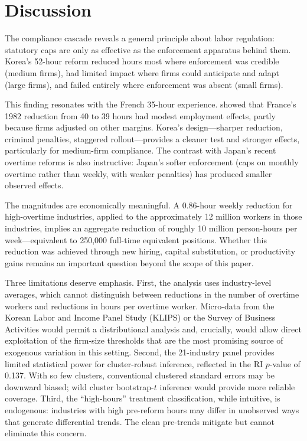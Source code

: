\documentclass[12pt]{article}
\begin{document}


\section{Discussion}
\label{sec:discussion}

The compliance cascade reveals a general principle about labor regulation: statutory caps are only as effective as the enforcement apparatus behind them. Korea's 52-hour reform reduced hours most where enforcement was credible (medium firms), had limited impact where firms could anticipate and adapt (large firms), and failed entirely where enforcement was absent (small firms).

This finding resonates with the French 35-hour experience. \citet{crepon2002} showed that France's 1982 reduction from 40 to 39 hours had modest employment effects, partly because firms adjusted on other margins. Korea's design---sharper reduction, criminal penalties, staggered rollout---provides a cleaner test and stronger effects, particularly for medium-firm compliance. The contrast with Japan's recent overtime reforms \citep{kawaguchi2020} is also instructive: Japan's softer enforcement (caps on monthly overtime rather than weekly, with weaker penalties) has produced smaller observed effects.

The magnitudes are economically meaningful. A 0.86-hour weekly reduction for high-overtime industries, applied to the approximately 12 million workers in those industries, implies an aggregate reduction of roughly 10 million person-hours per week---equivalent to 250,000 full-time equivalent positions. Whether this reduction was achieved through new hiring, capital substitution, or productivity gains remains an important question beyond the scope of this paper.

Three limitations deserve emphasis. First, the analysis uses industry-level averages, which cannot distinguish between reductions in the number of overtime workers and reductions in hours per overtime worker. Micro-data from the Korean Labor and Income Panel Study (KLIPS) or the Survey of Business Activities would permit a distributional analysis and, crucially, would allow direct exploitation of the firm-size thresholds that are the most promising source of exogenous variation in this setting. Second, the 21-industry panel provides limited statistical power for cluster-robust inference, reflected in the RI $p$-value of 0.137. With so few clusters, conventional clustered standard errors may be downward biased; wild cluster bootstrap-$t$ inference would provide more reliable coverage. Third, the ``high-hours'' treatment classification, while intuitive, is endogenous: industries with high pre-reform hours may differ in unobserved ways that generate differential trends. The clean pre-trends mitigate but cannot eliminate this concern.
\end{document}
